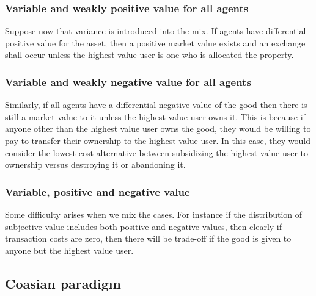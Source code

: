 \subsubsection{Variable and weakly positive value for all agents}

Suppose now that variance is introduced into the mix. If agents have differential positive value for the asset, then a positive market value exists and an exchange shall occur unless the highest value user is one who is allocated the property.

\subsubsection{Variable and weakly negative value for all agents}

Similarly, if all agents have a differential negative value of the good then there is still a market value to it unless the highest value user owns it. This is because if anyone other than the highest value user owns the good, they would be willing to pay to transfer their ownership to the highest value user. In this case, they would consider the lowest cost alternative between subsidizing the highest value user to ownership versus destroying it or abandoning it.

\subsubsection{Variable, positive and negative value}

Some difficulty arises when we mix the cases. For instance if the distribution of subjective value includes both positive and negative values, then clearly if transaction costs are zero, then there will be trade-off if the good is given to anyone but the highest value user.

\subsection{Coasian paradigm}\label{coase}

